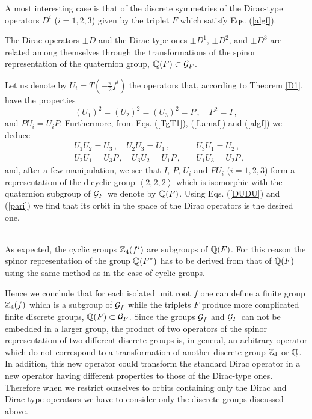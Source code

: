 \documentclass[a4paper,12pt]{article}
\begin{document}
A most interesting case is that of the discrete symmetries of the Dirac-type  
operators $D^i$ ($i=1,2,3$) given by the triplet $F$ which satisfy Eqs. 
(\ref{algf}). 
\begin{theor}
The Dirac operators $\pm D$ and the Dirac-type ones 
$\pm D^1$, $\pm D^2$, and $\pm D^3$ are related among themselves through the 
transformations of the spinor representation of the quaternion group,  
${\Bbb Q}(F)\subset {\cal G}_F$.
\end{theor}  
\begin{demo}
Let us denote by $U_i=T(-\frac{\pi}{2}f^i)$ the operators that, according to 
Theorem \ref{D1}, have the properties 
\begin{equation}
(U_1)^2=(U_2)^2=(U_3)^2=P\,,\quad P^2=I\,,
\end{equation} 
and $PU_i=U_i P$. Furthermore, from Eqs. (\ref{TgT1}), (\ref{Lamaf}) and 
(\ref{algf}) we deduce 
\begin{eqnarray}
&U_1 U_2=U_3\,, \quad U_2 U_3=U_1\,, \quad &U_3 U_1=U_2\,,\\  
&U_2 U_1=U_3 P\,, \quad U_3 U_2=U_1 P\,, \quad &U_1 U_3=U_2 P\,,  
\end{eqnarray}
and, after a few manipulation, we see that  $I$, $P$, $U_i$ and 
$PU_i$ ($i=1,2,3$) form a representation of the dicyclic group 
$\left<2,2,2 \right>$ which is isomorphic with the quaternion subgroup of 
${\cal G}_F$ we denote by ${\Bbb Q}(F)$.
Using Eqs. (\ref{DUDU}) and (\ref{pari}) we find that 
its orbit in the space of the Dirac operators is the desired one. 
\end{demo}\\ 
As expected, the cyclic groups  ${\Bbb Z}_4(f^i)$ are subgroups of 
${\Bbb Q}(F)$. For this reason the spinor representation of the group 
${\Bbb Q}(F^*)$ has to be derived from that of ${\Bbb Q}(F)$ using the same 
method as in the case of cyclic groups. 

Hence we conclude that for each isolated unit root $f$ one can define a finite 
group ${\Bbb Z}_4(f)$ which is a subgroup of ${\cal G}_f$ while the triplets 
$F$ produce  more complicated finite discrete groups, ${\Bbb Q}(F)\subset 
{\cal G}_F$. Since the groups ${\cal G}_f$ and ${\cal G}_F$ can not be embedded 
in a larger group, the product of two operators of the spinor representation 
of two different discrete groups is, in general, an arbitrary operator which
do not correspond to a transformation of another discrete group ${\Bbb Z}_4$ 
or ${\Bbb Q}$. In addition, this new operator could transform the standard 
Dirac operator in a new operator having  different properties to those of the 
Dirac-type ones. Therefore when we restrict ourselves to orbits containing 
only the Dirac  and Dirac-type operators we have to consider only the discrete 
groups discussed above.   
 
\end{document}
